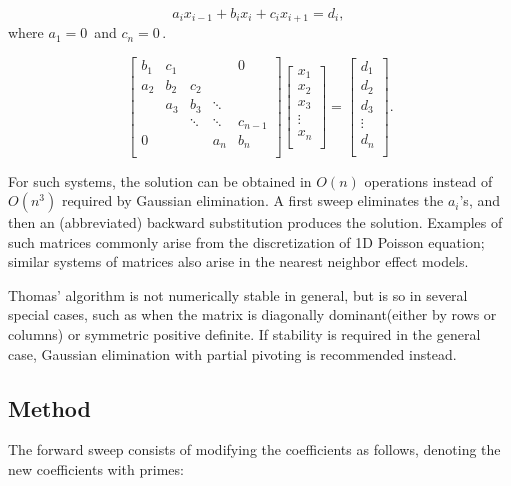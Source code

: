 \documentclass[preprint,12pt,3p]{elsarticle}
\begin{document}
\[a_i x_{i - 1}  + b_i x_i  + c_i x_{i + 1}  = d_i , \,\!\] where
\(a_1  = 0\,\) and \(c_n = 0\,\).

\[\begin{bmatrix}
   {b_1} & {c_1} & {   } & {   } & { 0 } \\
   {a_2} & {b_2} & {c_2} & {   } & {   } \\
   {   } & {a_3} & {b_3} & \ddots & {   } \\
   {   } & {   } & \ddots & \ddots & {c_{n-1}}\\
   { 0 } & {   } & {   } & {a_n} & {b_n}\\
\end{bmatrix}
\begin{bmatrix}
   {x_1 }  \\
   {x_2 }  \\
   {x_3 }  \\
   \vdots   \\
   {x_n }  \\
\end{bmatrix}
=
\begin{bmatrix}
   {d_1 }  \\
   {d_2 }  \\
   {d_3 }  \\
   \vdots   \\
   {d_n }  \\
\end{bmatrix}
.\]

For such systems, the solution can be obtained in \(O(n)\) operations
instead of \(O(n^3)\) required by Gaussian
elimination. A first sweep eliminates the \(a_i\)'s, and then an
(abbreviated) backward substitution produces the solution. Examples of
such matrices commonly arise from the discretization of 1D
Poisson equation; similar systems of
matrices also arise in the nearest neighbor effect models.

Thomas' algorithm is not numerically stable in general,
but is so in several special cases, such as when the matrix is
diagonally dominant(either by rows or
columns) or symmetric positive
definite. If
stability is required in the general case, Gaussian elimination with
partial pivoting is recommended
instead.

\subsection{Method}\label{method}

The forward sweep consists of modifying the coefficients as follows,
denoting the new coefficients with primes:
\end{document}
